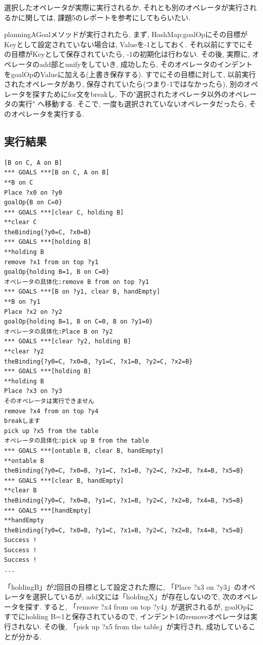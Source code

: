 \documentclass[uplatex,12pt]{jsarticle}
\begin{document}
選択したオペレータが実際に実行されるか, それとも別のオペレータが実行されるかに関しては, 課題5のレポートを参考にしてもらいたい.

planningAGoalメソッドが実行されたら, まず, HashMap:goalOpにその目標がKeyとして設定されていない場合は, Valueを-1としておく. それ以前にすでにその目標がKeyとして保存されていたら, -1の初期化は行わない. その後, 実際に, オペレータのadd部とunifyをしていき, 成功したら, そのオペレータのインデントをgoalOpのValueに加える(上書き保存する). すでにその目標に対して, 以前実行されたオペレータがあり, 保存されていたら(つまり-1ではなかったら), 別のオペレータを探すためにfor文をbreakし, 下の"選択されたオペレータ以外のオペレータの実行" へ移動する. そこで, 一度も選択されていないオペレータだったら, そのオペレータを実行する.

\subsection{実行結果}
\begin{lstlisting}[caption=goalOpによって制約される , label=src:No1]
[B on C, A on B]
*** GOALS ***[B on C, A on B]
**B on C
Place ?x0 on ?y0
goalOp{B on C=0}
*** GOALS ***[clear C, holding B]
**clear C
theBinding{?y0=C, ?x0=B}
*** GOALS ***[holding B]
**holding B
remove ?x1 from on top ?y1
goalOp{holding B=1, B on C=0}
オペレータの具体化:remove B from on top ?y1
*** GOALS ***[B on ?y1, clear B, handEmpty]
**B on ?y1
Place ?x2 on ?y2
goalOp{holding B=1, B on C=0, B on ?y1=0}
オペレータの具体化:Place B on ?y2
*** GOALS ***[clear ?y2, holding B]
**clear ?y2
theBinding{?y0=C, ?x0=B, ?y1=C, ?x1=B, ?y2=C, ?x2=B}
*** GOALS ***[holding B]
**holding B
Place ?x3 on ?y3
そのオペレータは実行できません
remove ?x4 from on top ?y4
breakします
pick up ?x5 from the table
オペレータの具体化:pick up B from the table
*** GOALS ***[ontable B, clear B, handEmpty]
**ontable B
theBinding{?y0=C, ?x0=B, ?y1=C, ?x1=B, ?y2=C, ?x2=B, ?x4=B, ?x5=B}
*** GOALS ***[clear B, handEmpty]
**clear B
theBinding{?y0=C, ?x0=B, ?y1=C, ?x1=B, ?y2=C, ?x2=B, ?x4=B, ?x5=B}
*** GOALS ***[handEmpty]
**handEmpty
theBinding{?y0=C, ?x0=B, ?y1=C, ?x1=B, ?y2=C, ?x2=B, ?x4=B, ?x5=B}
Success !
Success !
Success !
...
\end{lstlisting}

「holdingB」が2回目の目標として設定された際に, 「Place ?x3 on ?y3」のオペレータを選択しているが, add文には「holdingX」が存在しないので, 次のオペレータを探す. すると, 「remove ?x4 from on top ?y4」が選択されるが, goalOpにすでに{holding B=1}と保存されているので, インデント1のremoveオペレータは実行されない. その後, 「pick up ?x5 from the table」が実行され, 成功していることが分かる.
\end{document}
